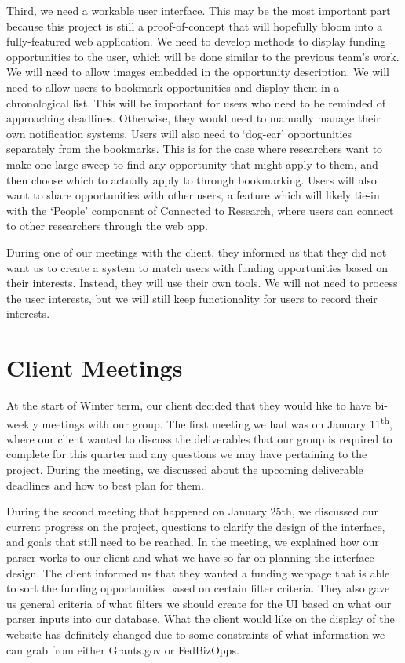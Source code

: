 \documentclass[onecolumn]{IEEEtran}
\begin{document}
Third, we need a workable user interface. This may be the most important part because this project is still a proof-of-concept that will hopefully bloom into a fully-featured web application. We need to develop methods to display funding opportunities to the user, which will be done similar to the previous team's work. We will need to allow images embedded in the opportunity description. We will need to allow users to bookmark opportunities and display them in a chronological list. This will be important for users who need to be reminded of approaching deadlines. Otherwise, they would need to manually manage their own notification systems. Users will also need to `dog-ear' opportunities separately from the bookmarks. This is for the case where researchers want to make one large sweep to find any opportunity that might apply to them, and then choose which to actually apply to through bookmarking. Users will also want to share opportunities with other users, a feature which will likely tie-in with the `People' component of Connected to Research, where users can connect to other researchers through the web app. 

During one of our meetings with the client, they informed us that they did not want us to create a system to match users with funding opportunities based on their interests. Instead, they will use their own tools. We will not need to process the user interests, but we will still keep functionality for users to record their interests.

\section{Client Meetings}

At the start of Winter term, our client decided that they would like to have bi-weekly meetings with our group. The first meeting we had was on January 11\textsuperscript{th},  where our client wanted to discuss the deliverables that our group is required to complete for this quarter and any questions we may have pertaining to the project. During the meeting, we discussed about the upcoming deliverable deadlines and how to best plan for them.

During the second meeting that happened on January 25th, we discussed our current progress on the project, questions to clarify the design of the interface, and goals that still need to be reached. In the meeting, we explained how our parser works to our client and what we have so far on planning the interface design. The client informed us that they wanted a funding webpage that is able to sort the funding opportunities based on certain filter criteria. They also gave us general criteria of what filters we should create for the UI based on what our parser inputs into our database. What the client would like on the display of the website has definitely changed due to some constraints of what information we can grab from either Grants.gov or FedBizOpps. 
\end{document}
